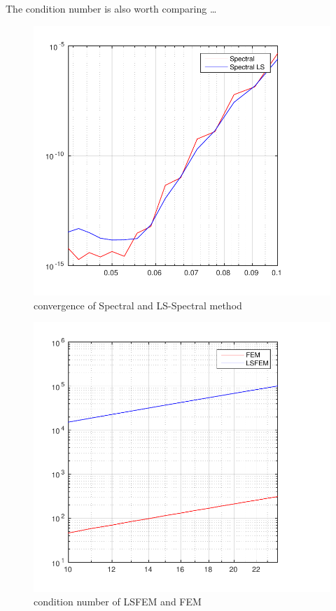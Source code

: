 %
The condition number is also worth comparing \ldots
%
\begin{figure}[hl]
	\centering
	\includegraphics{Figures/errorSpec-SpecLS.pdf}
	\caption{convergence of Spectral and LS-Spectral method}
	\label{fig:convergenceSpec}
\end{figure}
%
%
\begin{figure}[hl]
	\centering
  \includegraphics{Figures/condFEM-LSFEM.pdf}
	\caption{condition number of LSFEM and FEM}
	\label{fig:conditionFEM}
\end{figure}
